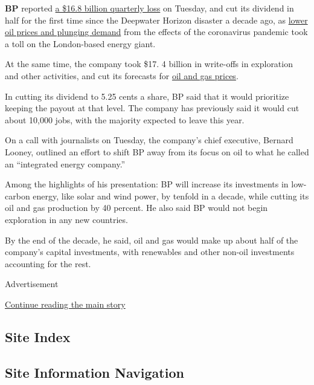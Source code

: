 \textbf{BP} reported
\href{https://www.nytimes.com/2020/08/04/business/energy-environment/bp-renewable-investment.html}{a
\$16.8 billion quarterly loss} on Tuesday, and cut its dividend in half
for the first time since the Deepwater Horizon disaster a decade ago, as
\href{https://www.nytimes.com/2020/07/30/business/shell-and-total-report-big-drop-in-profits-but-made-clean-energy-investments.html}{lower
oil prices and plunging demand} from the effects of the coronavirus
pandemic took a toll on the London-based energy giant.

At the same time, the company took \$17. 4 billion in write-offs in
exploration and other activities, and cut its forecasts for
\href{https://www.nytimes.com/live/2020/07/15/business/stock-market-today-coronavirus/opec-russia-and-other-oil-producers-will-ease-production-cuts}{oil
and gas prices}.

In cutting its dividend to 5.25 cents a share, BP said that it would
prioritize keeping the payout at that level. The company has previously
said it would cut about 10,000 jobs, with the majority expected to leave
this year.

On a call with journalists on Tuesday, the company's chief executive,
Bernard Looney, outlined an effort to shift BP away from its focus on
oil to what he called an ``integrated energy company.''

Among the highlights of his presentation: BP will increase its
investments in low-carbon energy, like solar and wind power, by tenfold
in a decade, while cutting its oil and gas production by 40 percent. He
also said BP would not begin exploration in any new countries.

By the end of the decade, he said, oil and gas would make up about half
of the company's capital investments, with renewables and other non-oil
investments accounting for the rest.

Advertisement

\protect\hyperlink{after-bottom}{Continue reading the main story}

\hypertarget{site-index}{%
\subsection{Site Index}\label{site-index}}

\hypertarget{site-information-navigation}{%
\subsection{Site Information
Navigation}\label{site-information-navigation}}

